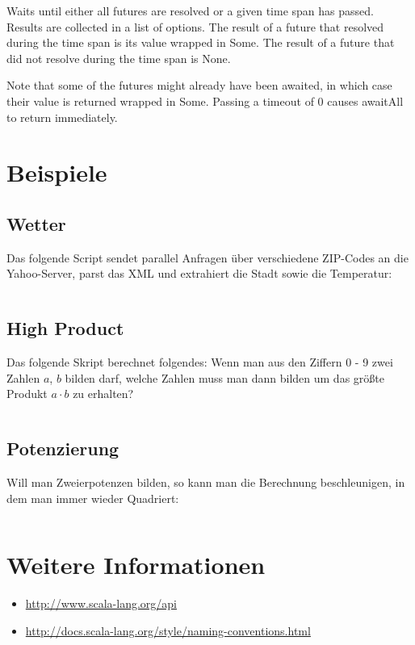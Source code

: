 Waits until either all futures are resolved or a given time span has passed. Results are collected in a list of options. The result of a future that resolved during the time span is its value wrapped in Some. The result of a future that did not resolve during the time span is None.

Note that some of the futures might already have been awaited, in which case their value is returned wrapped in Some. Passing a timeout of 0 causes awaitAll to return immediately.


\section{Beispiele}
\subsection{Wetter}
Das folgende Script sendet parallel Anfragen über verschiedene ZIP-Codes an
die Yahoo-Server, parst das XML und extrahiert die Stadt sowie die Temperatur:

\inputminted[linenos, numbersep=5pt, tabsize=4, frame=lines, label=weather.scala]{scala}{scripts/scala/weather.scala}

\subsection{High Product}
Das folgende Skript berechnet folgendes: Wenn man aus den Ziffern 0 - 9 zwei
Zahlen $a$, $b$ bilden darf, welche Zahlen muss man dann bilden um das größte Produkt
$a \cdot b$ zu erhalten?

\inputminted[linenos, numbersep=5pt, tabsize=4, frame=lines, label=main.scala]{scala}{scripts/scala/HighProduct.scala}

\subsection{Potenzierung}
Will man Zweierpotenzen bilden, so kann man die Berechnung beschleunigen, in dem
man immer wieder Quadriert:

\inputminted[linenos, numbersep=5pt, tabsize=4, frame=lines, label=power-futures.scala]{scala}{scripts/scala/power-futures.scala}

\section{Weitere Informationen}
\begin{itemize}
    \item \url{http://www.scala-lang.org/api}
    \item \url{http://docs.scala-lang.org/style/naming-conventions.html}
\end{itemize}

